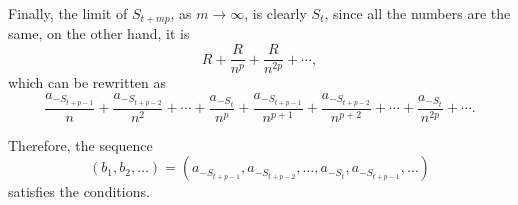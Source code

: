 Finally, the limit of $S_{t+mp}$, as $m \to \infty$, is clearly  $S_t$, since all the numbers are the same, on the other hand, it is \[
	R + \frac{R}{n^p} + \frac{R}{n^{2p}} + \cdots,
\]
which can be rewritten as \[
	\frac{a_{-S_{{t+p}-1}}}{n} + \frac{a_{-S_{{t+p}-2}}}{n^2} + \cdots + \frac{a_{-S_{t}}}{n^{p}} + 
	\frac{a_{-S_{{t+p}-1}}}{n^{p+1}} + \frac{a_{-S_{{t+p}-2}}}{n^{p+2}} + \cdots + \frac{a_{-S_{t}}}{n^{2p}} + 
	\cdots.
\]

Therefore, the sequence \[
	(b_1, b_2, \dots) = (a_{-S_{{t+p}-1}}, a_{-S_{{t+p}-2}}, \dots, a_{-S_t}, a_{-S_{{t+p}-1}}, \dots)
\]
satisfies the conditions.
